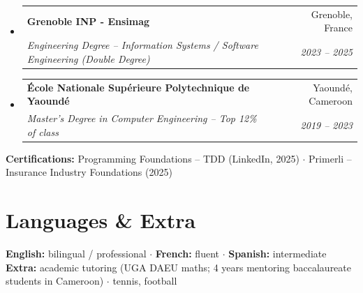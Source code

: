 \documentclass[letterpaper,10.5pt]{article}
\makeatletter
\newcommand{\resumeSubheading}[4]{
  \vspace{-1pt}\item
    \begin{tabular*}{0.97\textwidth}[t]{l@{\extracolsep{\fill}}r}
      \textbf{#1} & #2 \\
      \textit{\small#3} & \textit{\small #4} \\
    \end{tabular*}\vspace{-5pt}
}
\newcommand{\resumeSubHeadingListStart}{\begin{itemize}[leftmargin=0.15in, label={}]}
\newcommand{\resumeSubHeadingListEnd}{\end{itemize}}
\makeatother
\begin{document}
\resumeSubHeadingListStart
  \resumeSubheading
    {Grenoble INP - Ensimag}{Grenoble, France}
    {Engineering Degree -- Information Systems / Software Engineering (Double Degree)}{2023 -- 2025}
  \resumeSubheading
    {\'Ecole Nationale Sup\'erieure Polytechnique de Yaound\'e}{Yaound\'e, Cameroon}
    {Master's Degree in Computer Engineering -- Top 12\% of class}{2019 -- 2023}
\resumeSubHeadingListEnd
\small{
\textbf{Certifications:} Programming Foundations -- TDD (LinkedIn, 2025) $\cdot$ Primerli -- Insurance Industry Foundations (2025)
}

\section{Languages \& Extra}
\small{
\textbf{English:} bilingual / professional $\cdot$ \textbf{French:} fluent $\cdot$ \textbf{Spanish:} intermediate \\
\textbf{Extra:} academic tutoring (UGA DAEU maths; 4 years mentoring baccalaureate students in Cameroon) $\cdot$ tennis, football
}
\end{document}
